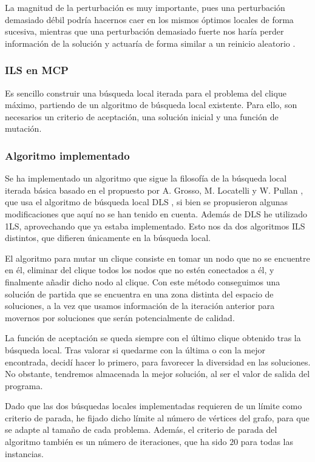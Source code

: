La magnitud de la perturbación es muy importante, pues una perturbación demasiado
débil podría hacernos caer en los mismos óptimos locales de forma sucesiva, mientras
que una perturbación demasiado fuerte nos haría perder información de la solución
y actuaría de forma similar a un reinicio aleatorio \citep{herrera:2014}.

\subsubsection{ILS en MCP}

Es sencillo construir una búsqueda local iterada para el problema del clique máximo,
partiendo de un algoritmo de búsqueda local existente. Para ello, son necesarios un
criterio de aceptación, una solución inicial y una función de mutación.

\subsubsection{Algoritmo implementado}

Se ha implementado un algoritmo que sigue la filosofía de la búsqueda local iterada
básica basado en el propuesto por A. Grosso, M. Locatelli y W. Pullan \citep{grosso:2008},
que usa el algoritmo de búsqueda local DLS \citep{pullan:2006}, si bien se propusieron
algunas modificaciones que aquí no se han tenido en cuenta. Además de DLS he utilizado
1LS, aprovechando que ya estaba implementado. Esto nos da dos algoritmos ILS distintos,
que difieren únicamente en la búsqueda local.

El algoritmo para mutar un clique consiste en tomar un nodo que no se encuentre en él,
eliminar del clique todos los nodos que no estén conectados a él, y finalmente añadir
dicho nodo al clique. Con este método conseguimos una solución de partida que se encuentra
en una zona distinta del espacio de soluciones, a la vez que usamos información de la
iteración anterior para movernos por soluciones que serán potencialmente de calidad.

La función de aceptación se queda siempre con el último clique obtenido tras la búsqueda local.
Tras valorar si quedarme con la última o con la mejor encontrada, decidí hacer lo primero,
para favorecer la diversidad en las soluciones. No obstante, tendremos almacenada la mejor
solución, al ser el valor de salida del programa.

Dado que las dos búsquedas locales implementadas requieren de un límite como criterio de
parada, he fijado dicho límite al número de vértices del grafo, para que se adapte al
tamaño de cada problema. Además, el criterio de parada del algoritmo también es un número
de iteraciones, que ha sido $20$ para todas las instancias.

